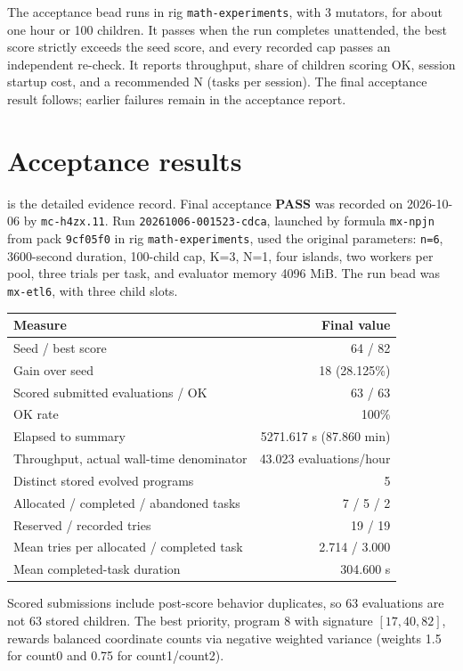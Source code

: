 \documentclass[11pt]{article}
\newcommand{\code}[1]{\texttt{#1}}
\begin{document}
The acceptance bead runs in rig \code{math-experiments}, with 3 mutators,
for about one hour or 100 children. It passes when the run completes unattended,
the best score strictly exceeds the seed score, and every recorded cap passes
an independent re-check. It reports throughput, share of children scoring OK,
session startup cost, and a recommended N (tasks per session). The final
acceptance result follows; earlier failures remain in the acceptance report.

\section{Acceptance results}
 is the detailed evidence record. Final acceptance
\textbf{PASS} was recorded on 2026-10-06 by \code{mc-h4zx.11}. Run
\code{20261006-001523-cdca}, launched by formula \code{mx-npjn} from pack
\code{9cf05f0} in rig \code{math-experiments}, used the original parameters:
\code{n=6}, 3600-second duration, 100-child cap, K=3, N=1, four islands,
two workers per pool, three trials per task, and evaluator memory 4096 MiB.
The run bead was \code{mx-etl6}, with three child slots.

\begin{center}
\begin{tabular}{@{}lr@{}}
\toprule Measure & Final value \\ \midrule
Seed / best score & 64 / 82 \\
Gain over seed & 18 (28.125\%) \\
Scored submitted evaluations / OK & 63 / 63 \\
OK rate & 100\% \\
Elapsed to summary & 5271.617 s (87.860 min) \\
Throughput, actual wall-time denominator & 43.023 evaluations/hour \\
Distinct stored evolved programs & 5 \\
Allocated / completed / abandoned tasks & 7 / 5 / 2 \\
Reserved / recorded tries & 19 / 19 \\
Mean tries per allocated / completed task & 2.714 / 3.000 \\
Mean completed-task duration & 304.600 s \\
\bottomrule
\end{tabular}
\end{center}
Scored submissions include post-score behavior duplicates, so 63 evaluations
are not 63 stored children. The best priority, program 8 with signature
$[17,40,82]$, rewards balanced coordinate counts via negative weighted variance
(weights 1.5 for count0 and 0.75 for count1/count2).
\end{document}
